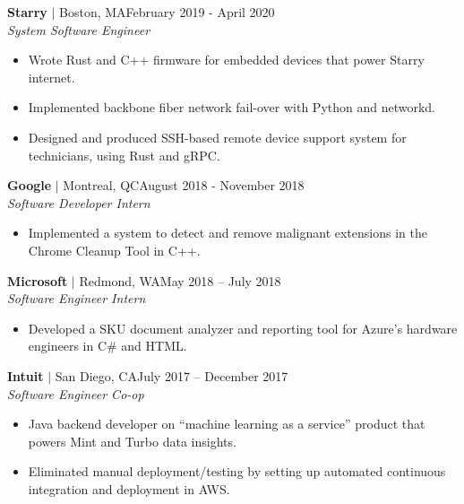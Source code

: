 \documentclass[overlapped,line]{res}
\begin{document}
\begin{resume}
\textbf{Starry} $|$ Boston, MA\hfill February 2019 - April 2020\\
{\sl System Software Engineer}
\begin{itemize} \itemsep -2pt
    \item Wrote Rust and C++ firmware for embedded devices that power Starry
	    internet.
    \item Implemented backbone fiber network fail-over with Python and networkd.
    \item Designed and produced SSH-based remote device support system for
	    technicians, using Rust and gRPC.
\end{itemize}

\textbf{Google} $|$ Montreal, QC\hfill August 2018 - November 2018\\
{\sl Software Developer Intern}
\begin{itemize} \itemsep -2pt
    \item Implemented a system to detect and remove malignant extensions in the Chrome Cleanup
		Tool in C++.%
\end{itemize}

\textbf{Microsoft} $|$ Redmond, WA\hfill May 2018 \--- July 2018\\
{\sl Software Engineer Intern}
\begin{itemize} \itemsep -2pt
	\item Developed a SKU document analyzer and reporting tool for Azure's
		hardware engineers in C\# and HTML.
\end{itemize}

\textbf{Intuit} $|$ San Diego, CA\hfill July 2017 \--- December 2017\\
{\sl Software Engineer Co-op}
\begin{itemize} \itemsep -2pt
	\item Java backend developer on ``machine learning as a service''
		product that powers Mint and Turbo data insights.
	\item Eliminated manual deployment/testing by setting up automated
      continuous integration and deployment in AWS.
\end{itemize}


\end{resume}
\end{document}
